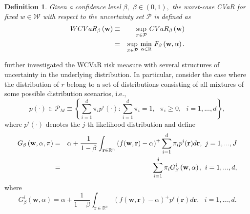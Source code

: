 \documentclass[a4paper,10pt]{article}
\newtheorem{definition}{Definition}
\begin{document}
\begin{definition}
	Given a confidence level $\beta ,$ $\beta \in (0,1),$ the worst-case CVaR
	for fixed $w\in \mathcal{W}$ with respect to the uncertainty set $\mathcal{P}
	$ is defined as
	\begin{eqnarray}
	WCVaR_{\beta }\left( \mathbf{w}\right) &\equiv &\underset{\pi \in \mathcal{P}%
	}{\sup }~ CVaR_{\beta }\left( \mathbf{w}\right)  \notag \\
	&=&\underset{\pi \in \mathcal{P}}{\sup }~\underset{\alpha \in
		\mathbb{R}
	}{\min }~F_{\beta }\left(\mathbf{w},\alpha \right).  \label{14}
	\end{eqnarray}
\end{definition}

\citet*{zhu2009worst} further investigated the WCVaR risk measure with
several structures of uncertainty in the underlying distribution. In
particular, \citet*{zhu2009worst} consider the case where the distribution
of $r$ belong to a set of distributions consisting of all mixtures of some
possible distribution scenarios, i.e.,
\begin{equation}
p\left( \cdot \right) \in \mathcal{P}_{M}\equiv \left\{ \sum_{i=1}^{d}\pi
_{i}p^{i}\left( \cdot \right) :\sum_{i=1}^{d}\pi _{i}=1,\text{ }\pi _{i}\geq
0,\text{ }i=1,...,d\right\} ,  \label{15}
\end{equation}%
where $p^{i}\left( \cdot \right) $ denotes the $j$-th likelihood
distribution and define
\begin{eqnarray}
G_{\beta }\left( \mathbf{w},\alpha ,\pi \right) &=&\alpha +\frac{1}{1-\beta }%
\int_{\mathbf{r}\in
	\mathbb{R}
	^{n}}\left( f(\mathbf{w},\mathbf{r})-\alpha \right) ^{+}\sum_{i=1}^{d}\pi
_{i}p^{i}(\mathbf{r})d\mathbf{r},\text{ }j=1,...,J  \notag \\
&=&\sum_{i=1}^{d}\pi _{i}G_{\beta }^{i}\left( \mathbf{w},\alpha \right) ,%
\text{ }i=1,...,d,  \label{16}
\end{eqnarray}%
where%
\begin{equation}
G_{\beta }^{i}\left( \mathbf{w},\alpha \right) =\alpha +\frac{1}{1-\beta }%
\int_{\mathbf{r}\in
	\mathbb{R}
	^{n}}\left( f(\mathbf{w},\mathbf{r})-\alpha \right) ^{+}p^{i}(\mathbf{r})d%
\mathbf{r},\text{ }i=1,...,d.  \label{17}
\end{equation}%
\end{document}
